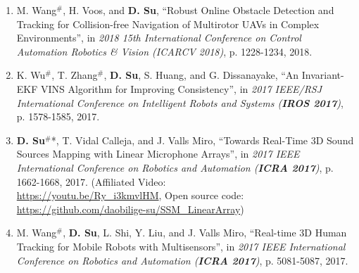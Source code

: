 \documentclass[margin,line]{res}
\begin{document}
\begin{resume}
\begin{enumerate}
\item M. Wang$^{\#}$, H. Voos, and {\bf D. Su}, ``Robust Online Obstacle Detection and Tracking for Collision-free Navigation of Multirotor UAVs in Complex Environments'', in {\it 2018 15th International Conference on Control Automation Robotics \& Vision (ICARCV 2018)}, p. 1228-1234, 2018.

\item K. Wu$^{\#}$, T. Zhang$^{\#}$, {\bf D. Su}, S. Huang, and G. Dissanayake, ``An Invariant-EKF VINS Algorithm for Improving Consistency'', in {\it 2017 IEEE/RSJ International Conference on Intelligent Robots and Systems (\textbf{IROS 2017})}, p. 1578-1585, 2017.

\item {\bf D. Su}$^{\#}$*, T. Vidal Calleja, and J. Valls Miro, ``Towards Real-Time 3D Sound Sources Mapping with Linear Microphone Arrays'', in {\it 2017 IEEE International Conference on Robotics and Automation (\textbf{ICRA 2017})}, p. 1662-1668, 2017.
(Affiliated Video: \\ \href{https://youtu.be/Ry_i3kmvlHM}{{https://youtu.be/Ry\_i3kmvlHM}}, Open source code: \\ \href{https://github.com/daobilige-su/SSM_LinearArray}{{https://github.com/daobilige-su/SSM\_LinearArray}})

\item M. Wang$^{\#}$, {\bf D. Su}, L. Shi, Y. Liu, and J. Valls Miro, ``Real-time 3D Human Tracking for Mobile Robots with Multisensors'', in {\it 2017 IEEE International Conference on Robotics and Automation (\textbf{ICRA 2017})}, p. 5081-5087, 2017.


\end{enumerate}
\end{resume}
\end{document}
